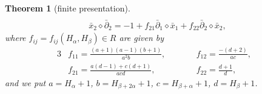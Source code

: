 \documentclass[pdftex]{sigma}
\numberwithin{equation}{section}
\newtheorem{Theorem}{Theorem}[section]
\begin{document}
\begin{Theorem}[finite presentation]
\begin{subequations}
\begin{gather}
			\\
			\label{eq:rel-x2p2}
			\bar x_2\diamond\bar \partial_2 =
			-1+f_{21}\bar \partial_1\diamond \bar x_1 +f_{22}\bar\partial_2\diamond\bar x_2,
		\end{gather}\end{subequations}
	where $f_{ij}=f_{ij}(H_\alpha,H_\beta)\in R$ are given by
	\begin{alignat}{3}
			& f_{11}=\frac{(a+1)(a-1)(b+1)}{a^2b}, \qquad&&
			f_{12}=\frac{-(d+2)}{ac},&\nonumber\\
			& f_{21}=\frac{a(d-1) + c(d+1)}{acd},\qquad&&
			f_{22}=\frac{d+1}{d},&\label{eq:abcdfij}
	\end{alignat}
	and we put $a=H_\alpha+1$, $ b=H_{\beta+2\alpha}+1$, $c=H_{\beta+\alpha}+1$, $d=H_\beta+1$.
\end{Theorem}
\end{document}
